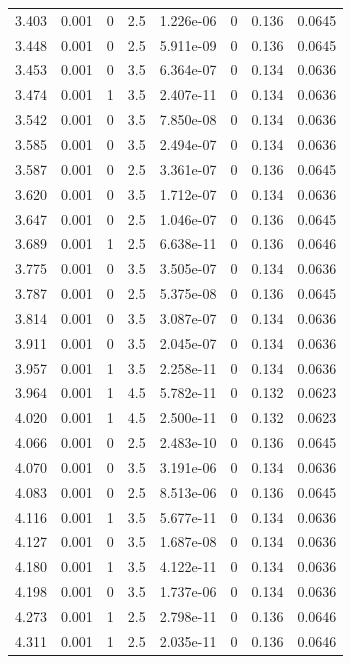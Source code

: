 \documentclass[preview]{standalone}
\begin{document}
{{{\begin{tabular}{L{1.2cm}C{1.2cm} C{0.3cm}C{0.5cm} C{1.4cm}C{1.4cm} C{1.4cm}C{1.4cm}}
  3.403  &  0.001  & 0     & 2.5 &  1.226e-06  & 0  & 0.136 &  0.0645   \\ 
  3.448  &  0.001  & 0     & 2.5 &  5.911e-09  & 0  & 0.136 &  0.0645   \\ 
  3.453  &  0.001  & 0     & 3.5 &  6.364e-07  & 0  & 0.134 &  0.0636   \\ 
  3.474  &  0.001  & 1     & 3.5 &  2.407e-11  & 0  & 0.134 &  0.0636   \\ 
  3.542  &  0.001  & 0     & 3.5 &  7.850e-08  & 0  & 0.134 &  0.0636   \\ 
  3.585  &  0.001  & 0     & 3.5 &  2.494e-07  & 0  & 0.134 &  0.0636   \\ 
  3.587  &  0.001  & 0     & 2.5 &  3.361e-07  & 0  & 0.136 &  0.0645   \\ 
  3.620  &  0.001  & 0     & 3.5 &  1.712e-07  & 0  & 0.134 &  0.0636   \\ 
  3.647  &  0.001  & 0     & 2.5 &  1.046e-07  & 0  & 0.136 &  0.0645   \\ 
  3.689  &  0.001  & 1     & 2.5 &  6.638e-11  & 0  & 0.136 &  0.0646   \\ 
  3.775  &  0.001  & 0     & 3.5 &  3.505e-07  & 0  & 0.134 &  0.0636   \\ 
  3.787  &  0.001  & 0     & 2.5 &  5.375e-08  & 0  & 0.136 &  0.0645   \\ 
  3.814  &  0.001  & 0     & 3.5 &  3.087e-07  & 0  & 0.134 &  0.0636   \\ 
  3.911  &  0.001  & 0     & 3.5 &  2.045e-07  & 0  & 0.134 &  0.0636   \\ 
  3.957  &  0.001  & 1     & 3.5 &  2.258e-11  & 0  & 0.134 &  0.0636   \\ 
  3.964  &  0.001  & 1     & 4.5 &  5.782e-11  & 0  & 0.132 &  0.0623   \\ 
  4.020  &  0.001  & 1     & 4.5 &  2.500e-11  & 0  & 0.132 &  0.0623   \\ 
  4.066  &  0.001  & 0     & 2.5 &  2.483e-10  & 0  & 0.136 &  0.0645   \\ 
  4.070  &  0.001  & 0     & 3.5 &  3.191e-06  & 0  & 0.134 &  0.0636   \\ 
  4.083  &  0.001  & 0     & 2.5 &  8.513e-06  & 0  & 0.136 &  0.0645   \\ 
  4.116  &  0.001  & 1     & 3.5 &  5.677e-11  & 0  & 0.134 &  0.0636   \\ 
  4.127  &  0.001  & 0     & 3.5 &  1.687e-08  & 0  & 0.134 &  0.0636   \\ 
  4.180  &  0.001  & 1     & 3.5 &  4.122e-11  & 0  & 0.134 &  0.0636   \\ 
  4.198  &  0.001  & 0     & 3.5 &  1.737e-06  & 0  & 0.134 &  0.0636   \\ 
  4.273  &  0.001  & 1     & 2.5 &  2.798e-11  & 0  & 0.136 &  0.0646   \\ 
  4.311  &  0.001  & 1     & 2.5 &  2.035e-11  & 0  & 0.136 &  0.0646   \\ 
\hline 
\end{tabular} 

}}}
\end{document}
